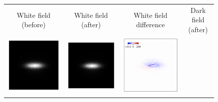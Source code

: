 \documentclass[12pt]{scrartcl}
\newcommand{\myscale}{1}
\begin{document}
\renewcommand{\myscale}{0.4}
\begin{figure}[htp]
\centering
\small
\begin{tabular}{cccc}
	 White field (before)
&  White field (after)
&  White field difference
&  Dark field (after)
\\
  \includegraphics[scale=\myscale]{whiteField_pre}
& \includegraphics[scale=\myscale]{whiteField_pst}
& \includegraphics[scale=\myscale]{whiteField_diff}

\end{tabular}
\end{figure}
\end{document}
